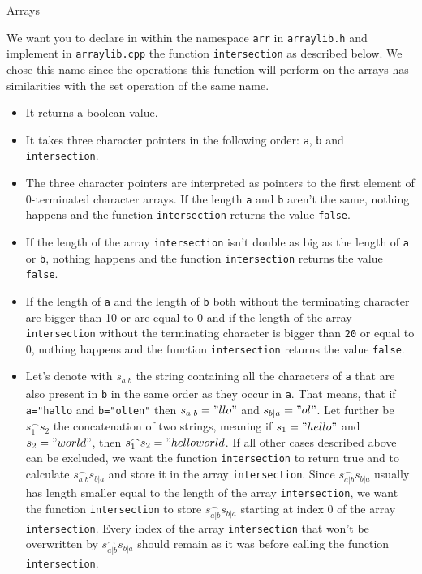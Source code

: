 \documentclass[12pt,a4paper]{scrartcl}
\begin{document}
\begin{aufgabe}[13]{Arrays}
        \begin{teilaufgabe}[4]
            We want you to declare in within the namespace \texttt{arr} in \texttt{arraylib.h} and implement in \texttt{arraylib.cpp} the function \texttt{intersection} as described below. We chose this name since the operations this function will perform on the arrays has similarities with the set operation of the same name.
            \begin{itemize}
                \item It returns a boolean value.
                \item It takes three character pointers in the following order: \texttt{a}, \texttt{b} and \texttt{intersection}.
                \item The three character pointers are interpreted as pointers to the first element of 0-terminated character arrays. If the length \texttt{a} and \texttt{b} aren't the same, nothing happens and the function \texttt{intersection} returns the value \texttt{false}.
                \item If the length of the array \texttt{intersection} isn't double as big as the length of \texttt{a} or \texttt{b}, nothing happens and the function \texttt{intersection} returns the value \texttt{false}.
                \item If the length of \texttt{a} and the length of \texttt{b} both without the terminating character are bigger than 10 or are equal to 0 and if the length of the array \texttt{intersection} without the terminating character is bigger than \texttt{20} or equal to 0, nothing happens and the function \texttt{intersection} returns the value \texttt{false}.
                \item Let's denote with $s_{a|b}$ the string containing all the characters of \texttt{a} that are also present in \texttt{b} in the same order as they occur in \texttt{a}. That means, that if \texttt{a="hallo} and \texttt{b="olten"} then $s_{a|b}="llo"$ and $s_{b|a}="ol"$. Let further be $s_1^\frown s_2$ the concatenation of two strings, meaning if $s_1="hello"$ and $s_2="world"$, then $s_1^\frown s_2 = "helloworld$.
                \newline
                \newline If all other cases described above can be excluded, we want the function \texttt{intersection} to return true and to calculate $s_{a|b}^\frown s_{b|a}$ and store it in the array \texttt{intersection}. Since $s_{a|b}^\frown s_{b|a}$ usually has length smaller equal to the length of the array \texttt{intersection}, we want the function \texttt{intersection} to store $s_{a|b}^\frown s_{b|a}$ starting at index 0 of the array \texttt{intersection}. Every index of the array \texttt{intersection} that won't be overwritten by $s_{a|b}^\frown s_{b|a}$ should remain as it was before calling the function \texttt{intersection}.
            \end{itemize}
        \end{teilaufgabe}

\end{aufgabe}
\end{document}
